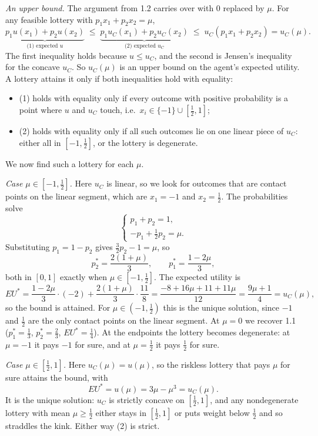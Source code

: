 \documentclass[12pt,letterpaper]{article}
\begin{document}
\textit{An upper bound.} The argument from 1.2 carries over with $0$ replaced by $\mu$. For any feasible lottery with $p_1x_1+p_2x_2=\mu$,
\[
\underbrace{p_1u(x_1)+p_2u(x_2)}_{\text{(1) expected } u}
\;\le\;
\underbrace{p_1u_C(x_1)+p_2u_C(x_2)}_{\text{(2) expected } u_C}
\;\le\;
u_C(p_1x_1+p_2x_2)=u_C(\mu).
\]
The first inequality holds because $u\le u_C$, and the second is Jensen's inequality for the concave $u_C$. So $u_C(\mu)$ is an upper bound on the agent's expected utility. A lottery attains it only if both inequalities hold with equality:
\begin{itemize}
  \item (1) holds with equality only if every outcome with positive probability is a point where $u$ and $u_C$ touch, i.e.\ $x_i\in\{-1\}\cup[\tfrac12,1]$;
  \item (2) holds with equality only if all such outcomes lie on one linear piece of $u_C$: either all in $[-1,\tfrac12]$, or the lottery is degenerate.
\end{itemize}
We now find such a lottery for each $\mu$.

\textit{Case $\mu\in[-1,\tfrac12]$.} Here $u_C$ is linear, so we look for outcomes that are contact points on the linear segment, which are $x_1=-1$ and $x_2=\tfrac12$. The probabilities solve
\[
\begin{cases}
p_1+p_2=1,\\[2pt]
-p_1+\tfrac12p_2=\mu.
\end{cases}
\]
Substituting $p_1=1-p_2$ gives $\tfrac32p_2-1=\mu$, so
\[
p_2^*=\frac{2(1+\mu)}{3},\qquad p_1^*=\frac{1-2\mu}{3},
\]
both in $[0,1]$ exactly when $\mu\in[-1,\tfrac12]$. The expected utility is
\[
EU^*=\frac{1-2\mu}{3}\cdot(-2)+\frac{2(1+\mu)}{3}\cdot\frac{11}{8}
=\frac{-8+16\mu+11+11\mu}{12}
=\frac{9\mu+1}{4}=u_C(\mu),
\]
so the bound is attained. For $\mu\in(-1,\tfrac12)$ this is the unique solution, since $-1$ and $\tfrac12$ are the only contact points on the linear segment. At $\mu=0$ we recover 1.1 ($p_1^*=\tfrac13$, $p_2^*=\tfrac23$, $EU^*=\tfrac14$). At the endpoints the lottery becomes degenerate: at $\mu=-1$ it pays $-1$ for sure, and at $\mu=\tfrac12$ it pays $\tfrac12$ for sure.

\textit{Case $\mu\in[\tfrac12,1]$.} Here $u_C(\mu)=u(\mu)$, so the riskless lottery that pays $\mu$ for sure attains the bound, with
\[
EU^*=u(\mu)=3\mu-\mu^3=u_C(\mu).
\]
It is the unique solution: $u_C$ is strictly concave on $[\tfrac12,1]$, and any nondegenerate lottery with mean $\mu\ge\tfrac12$ either stays in $[\tfrac12,1]$ or puts weight below $\tfrac12$ and so straddles the kink. Either way (2) is strict.
\end{document}
